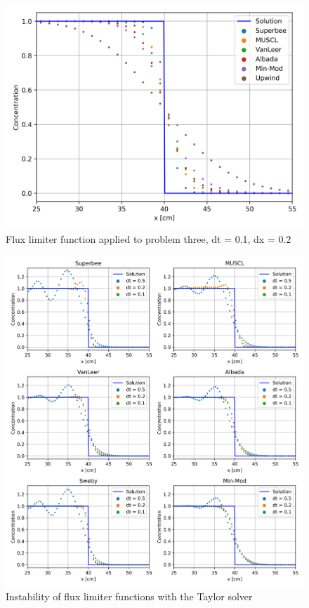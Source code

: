 \clearpage

\begin{figure}[p]
    \centering
    \includegraphics[width=5in]{images/chapter-5/progressionProblems/problem3/problem3FluxLimiters.png}
    \caption{Flux limiter function applied to problem three, dt = 0.1, dx = 0.2}
    \label{fig:fluxlimiters_problem3}
\end{figure}

\clearpage

\begin{figure}[p]
    \centering
    \includegraphics[width=6in]{images/chapter-5/progressionProblems/problem3/problem3SecondOrderFluxLimiterFunctionInstability.png}
    \caption{Instability of flux limiter functions with the Taylor solver}
    \label{fig:fluxlimiters_instability_problem3}
\end{figure}


